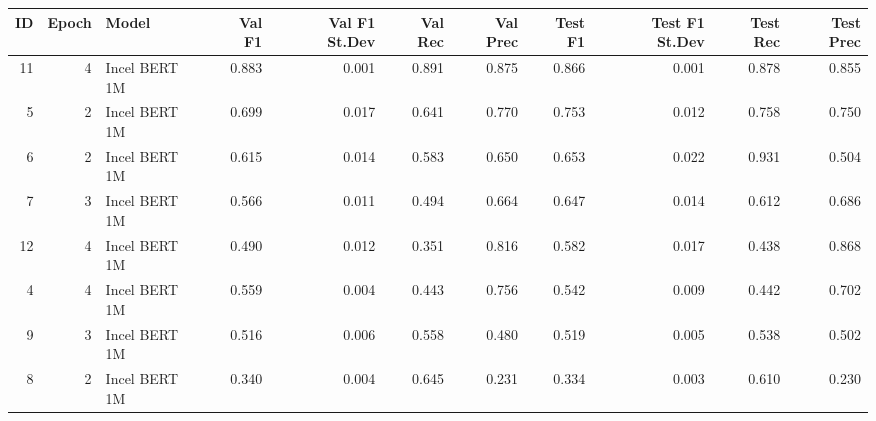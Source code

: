 \begin{tabular}{rrlrrrrrrrr}
\toprule
 ID &  Epoch &         Model &  Val F1 &  Val F1 St.Dev &  Val Rec &  Val Prec &  Test F1 &  Test F1 St.Dev &  Test Rec &  Test Prec \\
\midrule
 11 &      4 & Incel BERT 1M &   0.883 &          0.001 &    0.891 &     0.875 &    0.866 &           0.001 &     0.878 &      0.855 \\
  5 &      2 & Incel BERT 1M &   0.699 &          0.017 &    0.641 &     0.770 &    0.753 &           0.012 &     0.758 &      0.750 \\
  6 &      2 & Incel BERT 1M &   0.615 &          0.014 &    0.583 &     0.650 &    0.653 &           0.022 &     0.931 &      0.504 \\
  7 &      3 & Incel BERT 1M &   0.566 &          0.011 &    0.494 &     0.664 &    0.647 &           0.014 &     0.612 &      0.686 \\
 12 &      4 & Incel BERT 1M &   0.490 &          0.012 &    0.351 &     0.816 &    0.582 &           0.017 &     0.438 &      0.868 \\
  4 &      4 & Incel BERT 1M &   0.559 &          0.004 &    0.443 &     0.756 &    0.542 &           0.009 &     0.442 &      0.702 \\
  9 &      3 & Incel BERT 1M &   0.516 &          0.006 &    0.558 &     0.480 &    0.519 &           0.005 &     0.538 &      0.502 \\
  8 &      2 & Incel BERT 1M &   0.340 &          0.004 &    0.645 &     0.231 &    0.334 &           0.003 &     0.610 &      0.230 \\
\hline
\end{tabular}
